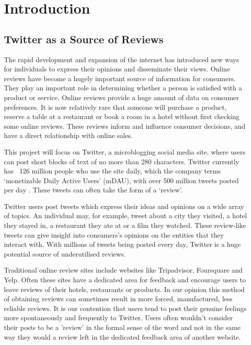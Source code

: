 
\chapter{Introduction}

\section{Twitter as a Source of Reviews}
The rapid development and expansion of the internet has introduced new ways for individuals to express their opinions and disseminate their views. Online reviews have become a hugely important source of information for consumers. They play an important role in determining whether a person is satisfied with a product or service. Online reviews provide a huge amount of data on consumer preferences. It is now relatively rare that someone will purchase a product, reserve a table at a restaurant or book a room in a hotel without first checking some online reviews. These reviews inform and influence consumer decisions, and have a direct relationship with online sales. 

This project will focus on Twitter, a microblogging social media site, where users can post short blocks of text of no more than 280 characters. Twitter currently has ~126 million people who use the site daily, which the company terms `monetizable Daily Active Users' (mDAU), with over 500 million tweets posted per day \cite{Twitter2019}. These tweets can often take the form of a `review'.

Twitter users post tweets which express their ideas and opinions on a wide array of topics. An individual may, for example, tweet about a city they visited, a hotel they stayed in, a restaurant they ate at or a film they watched. These review-like tweets can give insight into consumers’s opinions on the entities that they interact with. With millions of tweets being posted every day, Twitter is a huge potential source of underutilised reviews.

Traditional online review sites include websites like Tripadvisor, Foursquare and Yelp. Often these sites have a dedicated area for feedback and encourage users to leave reviews of their hotels, restaurants or products. In our opinion this method of obtaining reviews can sometimes result in more forced, manufactured, less reliable reviews. It is our contention that users tend to post their genuine feelings more spontaneously and frequently to Twitter. Users often wouldn't consider their posts to be a 'review' in the formal sense of the word and not in the same way they would a review left in the dedicated feedback area of another website.

